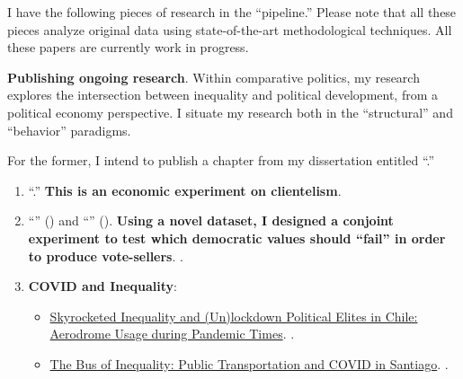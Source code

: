 \documentclass[10pt,stdletter,dateno,sigleft]{newlfm} %
\begin{document}
\begin{newlfm}
I have the following pieces of research in the ``pipeline.'' Please note that all these pieces analyze original data using state-of-the-art methodological techniques. All these papers are currently work in progress.


{\bf Publishing ongoing research}. Within comparative politics, my research explores the intersection between inequality and political development, from a political economy perspective. I situate my research both in the ``structural'' and ``behavior'' paradigms. 

For the former, I intend to publish a chapter from my dissertation entitled ``\href{https://github.com/hbahamonde/Earthquake_Paper/raw/master/Bahamonde_Earthquake_Paper.pdf}{\unskip}.'' \unskip 

\begin{enumerate}

  \item ``\href{https://github.com/hbahamonde/Economic_Experiment_Vote_Selling/raw/master/Vote_Selling_Bahamonde_Canales_Paper.pdf}{{\unskip}}.'' {\bf This is an economic experiment on clientelism}. {\unskip}

  \item ``\href{https://github.com/hbahamonde/Conjoint_US/raw/master/Bahamonde_Quininao_Conjoint_Letter_PA.pdf}{{\unskip}}'' ({\unskip}) and ``\href{https://github.com/hbahamonde/Conjoint_US/raw/master/Bahamonde_Quininao_Conjoint.pdf}{{\unskip}}'' ({\unskip}). {\bf Using a novel dataset, I designed a conjoint experiment to test which democratic values should ``fail'' in order to produce vote-sellers}. {\unskip}.

  \item {\bf COVID and Inequality}:
    \begin{itemize}
      \item \href{https://raw.githubusercontent.com/hbahamonde/Tobalaba/main/abstract.txt}{Skyrocketed Inequality and (Un)lockdown Political Elites in Chile: Aerodrome Usage during Pandemic Times}. {\unskip}. 
      \item \href{https://github.com/hbahamonde/Bus/raw/main/abstract.txt}{The Bus of Inequality: Public Transportation and COVID in Santiago}. {\unskip}. 
    \end{itemize}
\end{enumerate}



\end{newlfm}
\end{document}
